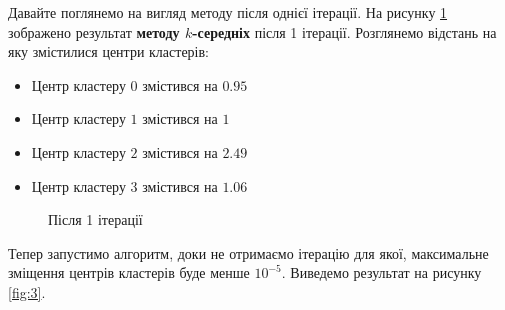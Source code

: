 \documentclass[a4paper,12pt]{article}
\begin{document}
Давайте поглянемо на вигляд методу після однієї ітерації. На рисунку \ref{fig:2} зображено результат \textbf{методу $k$-середніх} після 1 ітерації. Розглянемо відстань на яку змістилися центри кластерів:

\begin{itemize}
	\item Центр кластеру $0$ змістився на $0.95$
	\item Центр кластеру $1$ змістився на $1$
	\item Центр кластеру $2$ змістився на $2.49$
	\item Центр кластеру $3$ змістився на $1.06$	
\end{itemize}

\newpage
\begin{figure}[h]
	\caption{Після 1 ітерації}
	\label{fig:2}
\end{figure}

Тепер запустимо алгоритм, доки не отримаємо ітерацію для якої, максимальне зміщення центрів кластерів буде менше $10^{-5}$. Виведемо результат на рисунку \ref{fig:3}.
\end{document}

